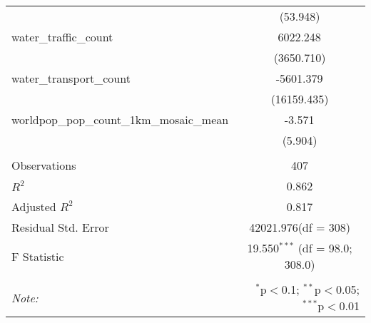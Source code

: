 \begin{table}[!htbp]
\begin{tabular}{@{\extracolsep{5pt}}lc}
  & (53.948) \\
 water_traffic_count & 6022.248$^{}$ \\
  & (3650.710) \\
 water_transport_count & -5601.379$^{}$ \\
  & (16159.435) \\
 worldpop_pop_count_1km_mosaic_mean & -3.571$^{}$ \\
  & (5.904) \\
\hline \\[-1.8ex]
 Observations & 407 \\
 $R^2$ & 0.862 \\
 Adjusted $R^2$ & 0.817 \\
 Residual Std. Error & 42021.976(df = 308)  \\
 F Statistic & 19.550$^{***}$ (df = 98.0; 308.0) \\
\hline
\hline \\[-1.8ex]
\textit{Note:} & \multicolumn{1}{r}{$^{*}$p$<$0.1; $^{**}$p$<$0.05; $^{***}$p$<$0.01} \\
\end{tabular}
\end{table}
